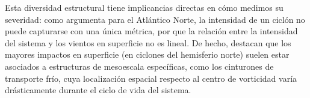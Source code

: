 %
Esta diversidad estructural tiene implicancias directas en cómo medimos su severidad: como argumenta \citet{corner2025classification} para el Atlántico Norte, la intensidad de un ciclón no puede capturarse con una única métrica, por que la relación entre la intensidad del sistema y los vientos en superficie no es lineal.
%
De hecho, \citet{eisenstein2023identification} destacan que los mayores impactos en superficie (en ciclones del hemisferio norte) suelen estar asociados a estructuras de mesoescala específicas, como los cinturones de transporte frío, cuya localización espacial respecto al centro de vorticidad varía drásticamente durante el ciclo de vida del sistema.
%
